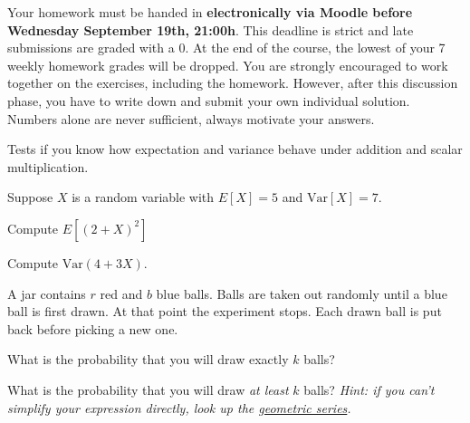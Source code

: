 \documentclass[a4paper,10pt,landscape,twocolumn]{scrartcl}
\newcommand\deadline{Wednesday September 19th, 21:00h}
\begin{document}
\homeworkproblems

{\sffamily\noindent
Your homework must be handed in \textbf{electronically via Moodle before \deadline}.  This deadline is strict and late submissions are graded with a 0. At the end of the course, the lowest of your 7 weekly homework grades will be dropped. You are strongly encouraged to work together on the exercises, including the homework. However, after this discussion phase, you have to write down and submit your own individual solution. Numbers alone are never sufficient, always motivate your answers.
}



\begin{exercise}
	\begin{mycomment}
		Tests if you know how expectation and variance behave under addition and scalar multiplication.
	\end{mycomment}
	
	Suppose $X$ is a random variable with $E[X] = 5$ and $\mathrm{Var}[X] = 7$.	
	\begin{subex}[0.5pt]
	Compute $E[(2+X)^2]$
	\end{subex}	
	
	\begin{subex}[0.5pt]
	Compute $\mathrm{Var}(4+3X)$.
	\end{subex}

\end{exercise}


\begin{exercise}
A jar contains $r$ red and $b$ blue balls. Balls are taken out randomly until a blue ball is first drawn. At that point the experiment stops. Each drawn ball is put back before picking a new one.
	\begin{subex}[1pt]
		What is the probability that you will draw exactly $k$ balls? 
	\end{subex}
	
	\begin{subex}[1.5pt]
		What is the probability that you will draw \emph{at
                  least} $k$ balls? \emph{Hint: if you can't simplify
                  your expression directly, look up the \href{https://en.wikipedia.org/wiki/Geometric_series}{geometric series}.}
	\end{subex}
\end{exercise}
\end{document}
